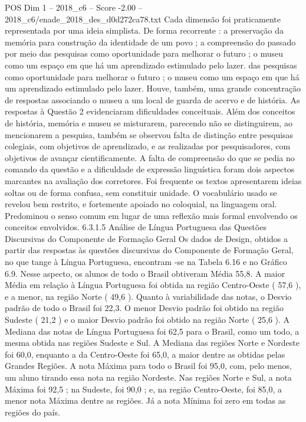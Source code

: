 \begin{textsample}{POS Dim 1 – 2018\_c6 – Score -2.00 – 2018\_c6/enade\_2018\_des\_d0d272ca78.txt}
Cada dimensão foi praticamente representada por uma ideia simplista.
De forma recorrente : a preservação da memória para construção da identidade de um povo ; a compreensão do passado por meio das pesquisas como oportunidade para melhorar o futuro ; o museu como um espaço em que há um aprendizado estimulado pelo lazer. das pesquisas como oportunidade para melhorar o futuro ; o museu como um espaço em que há um aprendizado estimulado pelo lazer.
Houve, também, uma grande concentração de respostas associando o museu a um local de guarda de acervo e de história.
As respostas à Questão 2 evidenciaram dificuldades conceituais.
Além dos conceitos de história, memória e museu se misturarem, parecendo não se distinguirem, ao mencionarem a pesquisa, também se observou falta de distinção entre pesquisas colegiais, com objetivos de aprendizado, e as realizadas por pesquisadores, com objetivos de avançar cientificamente.
A falta de compreensão do que se pedia no comando da questão e a dificuldade de expressão linguística foram dois aspectos marcantes na avaliação dos corretores.
Foi frequente os textos apresentarem ideias soltas ou de forma confusa, sem constituir unidade.
O vocabulário usado se revelou bem restrito, e fortemente apoiado no coloquial, na linguagem oral.
Predominou o senso comum em lugar de uma reflexão mais formal envolvendo os conceitos envolvidos. 6.3.1.5 Análise de Língua Portuguesa das Questões Discursivas do Componente de Formação Geral Os dados de Design, obtidos a partir das respostas às questões discursivas do Componente de Formação Geral, no que tange à Língua Portuguesa, encontram -se na Tabela 6.16 e no Gráfico 6.9.
Nesse aspecto, os alunos de todo o Brasil obtiveram Média 55,8.
A maior Média em relação à Língua Portuguesa foi obtida na região Centro-Oeste ( 57,6 ), e a menor, na região Norte ( 49,6 ).
Quanto à variabilidade das notas, o Desvio padrão de todo o Brasil foi 22,3.
O menor Desvio padrão foi obtido na região Sudeste ( 21,2 ) e o maior Desvio padrão foi obtido na região Norte ( 25,6 ).
A Mediana das notas de Língua Portuguesa foi 62,5 para o Brasil, como um todo, a mesma obtida nas regiões Sudeste e Sul.
A Mediana das regiões Norte e Nordeste foi 60,0, enquanto a da Centro-Oeste foi 65,0, a maior dentre as obtidas pelas Grandes Regiões.
A nota Máxima para todo o Brasil foi 95,0, com, pelo menos, um aluno tirando essa nota na região Nordeste.
Nas regiões Norte e Sul, a nota Máxima foi 92,5 ; na Sudeste, foi 90,0 ; e, na região Centro-Oeste, foi 85,0, a menor nota Máxima dentre as regiões.
Já a nota Mínima foi zero em todas as regiões do país.

\end{textsample}
